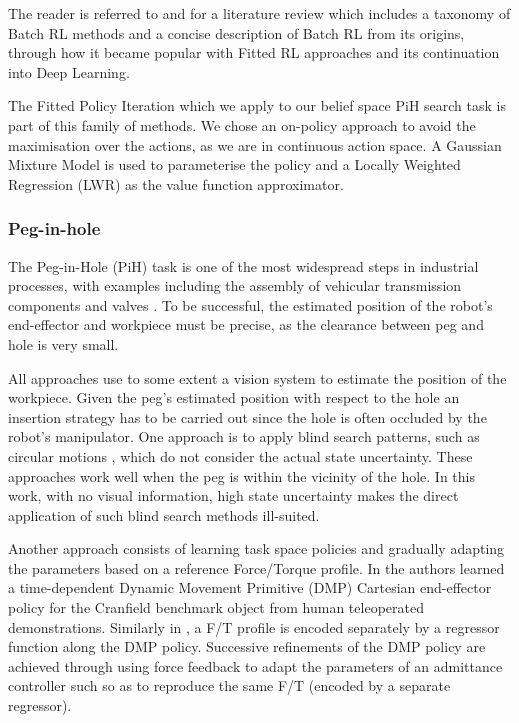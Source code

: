 \documentclass[final,5p,times,twocolumn]{elsarticle}
\begin{document}
The reader is referred to \cite{approx_rl_overview_2011} and \cite[Chap 2]{RL_state_art_2012} for a literature 
review which includes a taxonomy of Batch RL methods and a concise description of Batch RL from its origins, 
through how it became popular with Fitted RL approaches and its continuation into Deep Learning.

The Fitted Policy Iteration which we apply to our belief space PiH search task is part of this family of methods.
We chose an on-policy approach to avoid the maximisation over the actions, as we are in continuous action space.
A Gaussian Mixture Model is used to parameterise the policy and a Locally Weighted Regression (LWR) as 
the value function approximator.


\subsubsection{Peg-in-hole}

The Peg-in-Hole (PiH) task is one of the most widespread steps in industrial processes, 
with examples including the assembly of vehicular transmission components \cite{search_strategies_icra_2001} and 
valves \cite{online_gpr_icra_2014}. To be successful, the estimated position of the robot's end-effector 
and workpiece must be precise, as the clearance between peg and hole is very small.

All approaches use to some extent a vision system \cite{peg_personal_icra_2010} to estimate 
the position of the workpiece. Given  the peg's estimated position with respect to the hole 
an insertion strategy has to be carried out since the hole is often occluded by 
the robot's manipulator. One approach is to apply blind search patterns, such as circular 
motions \cite{search_strategies_icra_2001}, which do not consider the actual state uncertainty. 
These approaches work well when the peg is within the vicinity of the hole. In this work, with 
no visual information, high state uncertainty makes the direct application of such blind 
search methods ill-suited.

Another approach consists of learning task space policies and gradually adapting the parameters based on a reference
Force/Torque profile. In \cite{fast_peg_pbd_icmc_2014} the authors learned a time-dependent Dynamic Movement 
Primitive (DMP) \cite{Schaal04learningmovement} Cartesian end-effector policy for the Cranfield benchmark 
object from human teleoperated demonstrations. Similarly in \cite{trans_workpiece_icra_2013,sol_pdg_pbd_2014}, 
a F/T profile is encoded separately by a regressor function along the DMP policy. Successive refinements of 
the DMP policy are achieved through using force feedback to adapt the parameters of an admittance controller such 
so as to reproduce the same F/T (encoded by a separate regressor).
\end{document}
